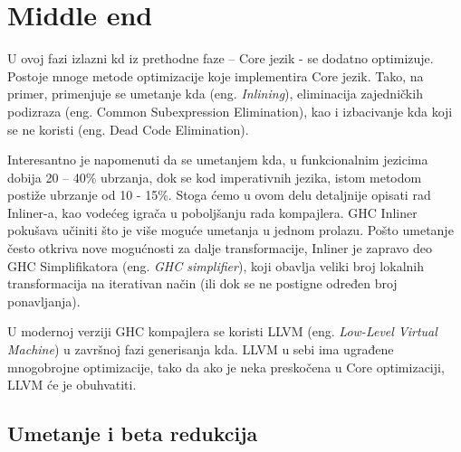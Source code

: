 \section{Middle end}
\label{sec:middle}

U ovoj fazi izlazni kd iz prethodne faze – Core jezik - se dodatno optimizuje. Postoje mnoge metode optimizacije koje implementira Core jezik. Tako, na primer, primenjuje se umetanje kda (eng. \emph{Inlining}), eliminacija zajedničkih podizraza (eng. Common Subexpression Elimination), kao i izbacivanje kda koji se ne koristi (eng. Dead Code Elimination).

Interesantno je napomenuti da se umetanjem kda, u funkcionalnim jezicima dobija 20 – 40\% ubrzanja, dok se kod imperativnih jezika, istom metodom postiže ubrzanje od 10 - 15\%. Stoga ćemo u ovom delu detaljnije opisati rad Inliner-a, kao vodećeg igrača u poboljšanju rada kompajlera. GHC Inliner pokušava učiniti što je više moguće umetanja u jednom prolazu. Pošto umetanje često otkriva nove mogućnosti za dalje transformacije, Inliner je zapravo deo GHC Simplifikatora (eng. \emph{GHC simplifier}), koji obavlja veliki broj lokalnih transformacija na iterativan način (ili dok se ne postigne određen broj ponavljanja).

U modernoj verziji GHC kompajlera se koristi LLVM (eng. \emph{Low-Level Virtual Machine}) u završnoj fazi generisanja kda. LLVM u sebi ima ugrađene mnogobrojne optimizacije, tako da ako je neka preskočena u Core optimizaciji, LLVM će je obuhvatiti.

\subsection{Umetanje i beta redukcija}
\label{subsec:podnaslovInlineBeta}

